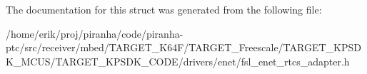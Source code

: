 The documentation for this struct was generated from the following file\+:\begin{DoxyCompactItemize}
\item 
/home/erik/proj/piranha/code/piranha-\/ptc/src/receiver/mbed/\+T\+A\+R\+G\+E\+T\+\_\+\+K64\+F/\+T\+A\+R\+G\+E\+T\+\_\+\+Freescale/\+T\+A\+R\+G\+E\+T\+\_\+\+K\+P\+S\+D\+K\+\_\+\+M\+C\+U\+S/\+T\+A\+R\+G\+E\+T\+\_\+\+K\+P\+S\+D\+K\+\_\+\+C\+O\+D\+E/drivers/enet/fsl\+\_\+enet\+\_\+rtcs\+\_\+adapter.\+h\end{DoxyCompactItemize}
